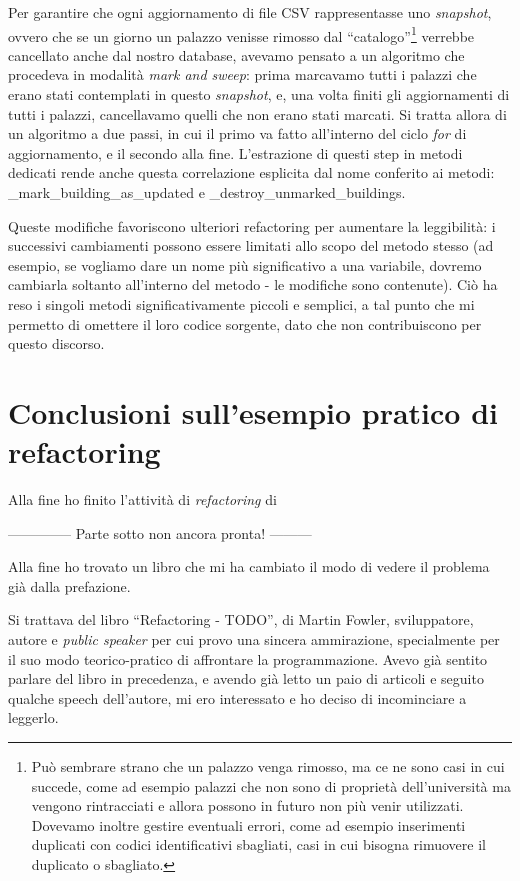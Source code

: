 \documentclass[12pt]{report}
\begin{document}
Per garantire che ogni aggiornamento di
file CSV rappresentasse uno \textit{snapshot}, ovvero che se un giorno un
palazzo venisse rimosso dal ``catalogo''\footnote{
Può sembrare strano che un palazzo venga rimosso, ma ce ne sono casi in cui
succede, come ad esempio palazzi che non sono di proprietà dell'università
ma vengono rintracciati e allora possono in futuro non più venir utilizzati. 
Dovevamo inoltre gestire eventuali errori, come ad esempio inserimenti duplicati
con codici identificativi sbagliati, casi in cui bisogna rimuovere il duplicato
o sbagliato.
}
verrebbe cancellato anche dal nostro database, avevamo pensato a un algoritmo
che procedeva in modalità \textit{mark and sweep}: prima marcavamo tutti i palazzi
che erano stati contemplati in questo \textit{snapshot}, e, una volta
finiti gli aggiornamenti di tutti i palazzi, cancellavamo quelli
che non erano stati marcati. Si tratta allora di un algoritmo a due passi,
in cui il primo va fatto all'interno del ciclo \textit{for} di
aggiornamento, e il 
secondo alla fine. L'estrazione di questi step in metodi dedicati
rende anche questa correlazione esplicita dal nome conferito ai metodi:
\_mark\_building\_as\_updated e \_destroy\_unmarked\_buildings.

Queste modifiche favoriscono ulteriori refactoring per 
aumentare la leggibilità: i successivi cambiamenti possono 
essere limitati allo scopo del metodo stesso (ad esempio, 
se vogliamo dare un nome più significativo a una variabile, 
dovremo cambiarla soltanto all'interno del metodo - le modifiche sono
contenute). Ciò ha reso i singoli metodi significativamente piccoli e
semplici, a tal punto che mi permetto di omettere il loro codice sorgente,
dato che non contribuiscono per questo discorso.

\section{Conclusioni sull'esempio pratico di refactoring}
Alla fine ho finito l'attività di \textit{refactoring} di




-------------- Parte sotto non ancora pronta! ---------

Alla fine ho trovato un libro che mi ha cambiato il modo di vedere il problema 
già dalla prefazione.


Si trattava del libro ``Refactoring - TODO'', di Martin Fowler, sviluppatore, 
autore e \textit{public speaker} per cui provo una sincera ammirazione,
specialmente per il suo modo teorico-pratico di affrontare la programmazione. 
Avevo già sentito parlare del libro in precedenza, e avendo già letto un paio 
di articoli e seguito qualche speech dell'autore, mi ero interessato e 
ho deciso di incominciare a leggerlo. 
\end{document}
